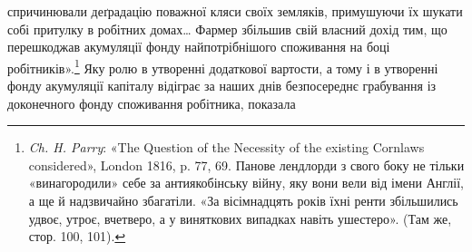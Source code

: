 спричинювали деґрадацію поважної кляси своїх земляків, примушуючи
їх шукати собі притулку в робітних домах\dots{} Фармер
збільшив свій власний дохід тим, що перешкоджав акумуляції
фонду найпотрібнішого споживання на боці робітників».\footnote{
\emph{Ch. H. Parry}: «The Question of the Necessity of the existing Cornlaws
considered», London 1816, p. 77, 69. Панове лендлорди з свого боку
не тільки «винагородили» себе за антиякобінську війну, яку вони вели
від імени Англії, а ще й надзвичайно збагатіли. «За вісімнадцять років
їхні ренти збільшились удвоє, утроє, вчетверо, а у виняткових випадках
навіть ушестеро». (Там же, стор. 100, 101).
} Яку
ролю в утворенні додаткової вартости, а тому і в утворенні
фонду акумуляції капіталу відіграє за наших днів безпосереднє
грабування із доконечного фонду споживання робітника, показала
\parbreak{}  %
